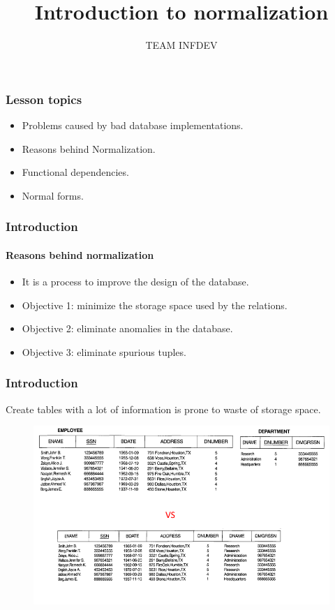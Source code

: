 \documentclass{beamer}
\title{Introduction to normalization}
\author{TEAM INFDEV}
\institute{Hogeschool Rotterdam \\ 
	Rotterdam, Netherlands}
\date{}
\begin{document}
\maketitle


\begin{frame}
	\frametitle{Lesson topics}
	\begin{itemize}
		\item Problems caused by bad database implementations.
		\item Reasons behind Normalization.
		\item Functional dependencies.
		\item Normal forms.
	\end{itemize}
\end{frame}


\begin{frame}
	\frametitle{Introduction}
	\framesubtitle{Reasons behind normalization}
	\begin{itemize}
		\item It is a process to improve the design of the database.
		\item Objective 1: minimize the storage space used by the relations.
		\item Objective 2: eliminate anomalies in the database.
		\item Objective 3: eliminate spurious tuples.
	\end{itemize}
\end{frame}

\begin{frame}
	\frametitle{Introduction}
	Create tables with a lot of information is prone to waste of storage space.

	\begin{figure}
		\includegraphics[scale=0.4]{img/normalization/norm1}
	\end{figure}
\end{frame}
\end{document}
